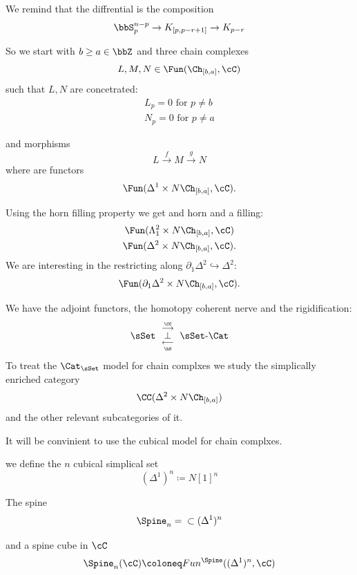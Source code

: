 We remind that the diffrential is the composition 
\[
    \bbS_p^{n-p} \to K_{[p,p-r+1]} \to K_{p-r}
\]

So we start with $b \geq a \in \bbZ$ and three chain complexes
\[
    L,M,N \in \Fun(\Ch_{[b,a]},\cC)
\]
such that $L,N$ are concetrated:
\begin{gather*}
    L_p = 0 \text{ for } p \neq b \\
    N_p = 0 \text{ for } p \neq a
\end{gather*}

and morphisms
\[
    L \xrightarrow{f} M \xrightarrow{g} N
\]
where are functors
\[
    \Fun(\Delta^1 \times N \Ch_{[b,a]}, \cC).
\]

Using the horn filling property we get and horn and a filling:
\begin{gather*}
    \Fun(\Lambda^2_1 \times N \Ch_{[b,a]}, \cC) \\
    \Fun(\Delta^2 \times N \Ch_{[b,a]}, \cC).
\end{gather*}
We are interesting in the restricting along $\partial_1 \Delta^2 \hookrightarrow \Delta^2$:
\[
    \Fun(\partial_1 \Delta^2 \times N \Ch_{[b,a]}, \cC).
\]

We have the adjoint functors, the homotopy coherent nerve and the rigidification:
\[
    \sSet \ \underset{\underset{\hN}{\longleftarrow}}{\overset{\overset{\CC}{\longrightarrow}}{\perp}} \ \sSet\text{-}\Cat
\]
To treat the $\Cat_\sSet$ model for chain complxes we study the simplically enriched category
\[
    \CC (\Delta^2 \times N \Ch_{[b,a]})
\]
and the other relevant subcategories of it.

It will be convinient to use the cubical model for chain complxes.

we define the $n$ cubical simplical set
\[
    (\Delta^1)^n \coloneq N [1]^n 
\]

The spine 
\[
    \Spine_n = {} \subset (\Delta^1)^n
\]

and a spine cube in $\cC$
\[
    \Spine_n(\cC) \coloneq Fun^{\Spine}((\Delta^1)^n, \cC)
\]